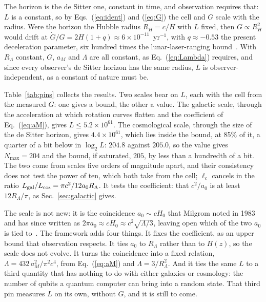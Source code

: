 \documentclass[aps,prd,twocolumn,superscriptaddress,nofootinbib,showkeys]{revtex4-2}
\makeatletter
\newcommand{\lc}{\ell_c}
\newcommand{\RL}{R_\Lambda}
\def\section{\@startsection{section}{1}{\z@}{0.6cm \@plus1ex \@minus .2ex}{0.35cm}{\normalfont\small\bfseries}}
\makeatother
\begin{document}
The horizon is the de Sitter one, constant in time, and observation requires that: $L$ is a constant, so by Eqs.~(\ref{eq:ident}) and (\ref{eq:G}) the cell and $G$ scale with the radius. Were the horizon the Hubble radius $R_H = c/H$ with $L$ fixed, then $G\propto R_H^2$ would drift at $\dot G/G = 2H(1+q)\approx6\times10^{-11}$~yr$^{-1}$, with $q\approx-0.53$ the present deceleration parameter, six hundred times the lunar-laser-ranging bound~\cite{hofmann2018}. With $\RL$ constant, $G$, $a_M$ and $\Lambda$ are all constant, as Eq.~(\ref{eq:Lambda}) requires, and since every observer's de Sitter horizon has the same radius, $L$ is observer-independent, as a constant of nature must be.

\section{Does $L$ Hold?}
\label{sec:hold}

Table~\ref{tab:pins} collects the results. Two scales bear on $L$, each with the cell from the measured $G$: one gives a bound, the other a value. The galactic scale, through the acceleration at which rotation curves flatten and the coefficient of Eq.~(\ref{eq:aM}), gives $L \le 5.2\times10^{61}$. The cosmological scale, through the size of the de Sitter horizon, gives $4.4\times10^{61}$, which lies inside the bound, at 85\% of it, a quarter of a bit below in $\log_2L$: $204.8$ against $205.0$, so the value gives $N_{\max} = 204$ and the bound, if saturated, $205$, by less than a hundredth of a bit. The two come from scales five orders of magnitude apart, and their consistency does not test the power of ten, which both take from the cell; $\lc$ cancels in the ratio $L_{\rm gal}/L_{\rm cos} = \pi c^2/12 a_0\RL$. It tests the coefficient: that $c^2/a_0$ is at least $12\RL/\pi$, as Sec.~\ref{sec:galactic} gives.

The scale is not new: it is the coincidence $a_0\sim cH_0$ that Milgrom noted in 1983~\cite{milgrom1983} and has since written as $2\pi a_0\approx cH_0\approx c^2\sqrt{\Lambda/3}$, leaving open which of the two $a_0$ is tied to~\cite{milgrom2020}. The framework adds four things. It fixes the coefficient, as an upper bound that observation respects. It ties $a_0$ to $\RL$ rather than to $H(z)$, so the scale does not evolve. It turns the coincidence into a fixed relation, $\Lambda = 432\,a_M^2/\pi^2c^4$, from Eq.~(\ref{eq:aM}) and $\Lambda = 3/\RL^2$. And it ties the same $L$ to a third quantity that has nothing to do with either galaxies or cosmology: the number of qubits a quantum computer can bring into a random state. That third pin measures $L$ on its own, without $G$, and it is still to come.
\end{document}
